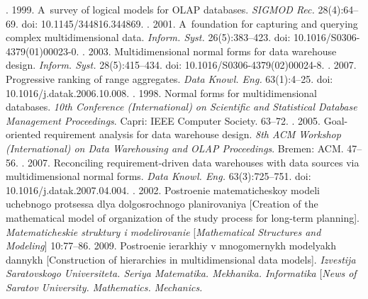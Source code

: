   \begin{multicols}{2}

\renewcommand{\bibname}{\protect\rmfamily References}

{\small\frenchspacing
{%
\begin{thebibliography}{99}
. 1999. 
A~survey of logical models for OLAP databases. 
\textit{SIGMOD Rec.} 28(4):64--69. doi: 10.1145/344816.344869.
. 2001. 
A~foundation for capturing and querying complex multidimensional data. 
\textit{Inform. Syst.} 26(5):383--423. doi: 10.1016/S0306-4379(01)00023-0.
. 2003. 
Multidimensional normal forms for data warehouse design. 
\textit{Inform. Syst.} 28(5):415--434. doi: 10.1016/S0306-4379(02)00024-8.
. 2007. 
Progressive ranking of range aggregates. \textit{Data Knowl. Eng.} 63(1):4--25. 
doi: 10.1016/j.datak.2006.10.008.
. 1998. 
Normal forms for multidimensional databases. 
\textit{10th  Conference (International) on Scientific and Statistical Database Management
Proceedings}. Capri: IEEE Computer Society. 63--72.
. 2005. 
Goal-oriented requirement analysis for data warehouse design. 
\textit{8th ACM  Workshop (International) on Data Warehousing and OLAP Proceedings}. Bremen: 
ACM. 47--56.
. 2007. 
Reconciling requirement-driven data warehouses with data sources 
via multidimensional normal forms. \textit{Data Knowl. Eng.} 63(3):725--751. 
doi: 10.1016/j.datak.2007.04.004.
. 2002. 
Postroenie mate\-ma\-ti\-che\-skoy modeli uchebnogo protsessa dlya dol\-go\-sroch\-no\-go planirovaniya 
[Creation of the mathematical model of organization of the study process for long-term 
planning]. \textit{Matematicheskie struktury i modelirovanie} 
[\textit{Mathematical Structures and Modeling}] 10:77--86.
 2009. Postroenie ierarkhiy v mnogomernykh modelyakh dannykh 
[Construction of hierarchies in multidimensional data models]. 
\textit{Izvestija Saratovskogo Universiteta. Seriya Matematika. Mekhanika. Informatika} 
[\textit{News of Saratov University. Mathematics. Mechanics. 
}
\end{thebibliography}}}
\end{multicols}
